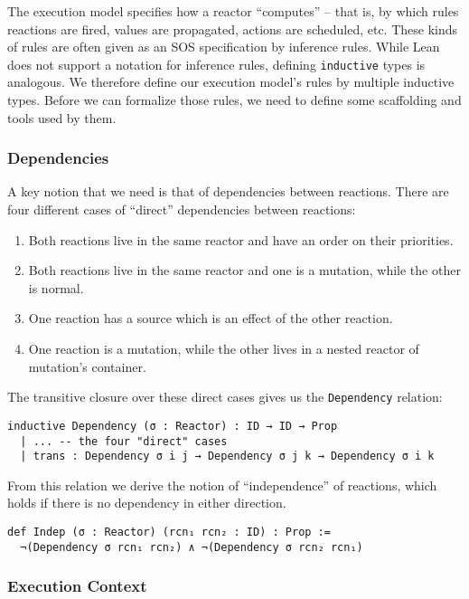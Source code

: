 The execution model specifies how a reactor ``computes'' -- that is, by which rules reactions are fired, values are propagated, actions are scheduled, etc. 
These kinds of rules are often given as an SOS specification by inference rules.
While Lean does not support a notation for inference rules, defining \lstinline{inductive} types is analogous.
We therefore define our execution model's rules by multiple inductive types.
Before we can formalize those rules, we need to define some scaffolding and tools used by them.

\subsubsection{Dependencies}

A key notion that we need is that of dependencies between reactions. 
There are four different cases of ``direct'' dependencies between reactions:

\begin{enumerate}
  \item Both reactions live in the same reactor and have an order on their priorities.
  \item Both reactions live in the same reactor and one is a mutation, while the other is normal.
  \item One reaction has a source which is an effect of the other reaction.
  \item One reaction is a mutation, while the other lives in a nested reactor of mutation's container.
\end{enumerate}

The transitive closure over these direct cases gives us the \lstinline{Dependency} relation:

\begin{lstlisting}
inductive Dependency (σ : Reactor) : ID → ID → Prop
  | ... -- the four "direct" cases
  | trans : Dependency σ i j → Dependency σ j k → Dependency σ i k
\end{lstlisting}

From this relation we derive the notion of ``independence'' of reactions, which holds if there is no dependency in either direction.

\begin{lstlisting}
def Indep (σ : Reactor) (rcn₁ rcn₂ : ID) : Prop :=
  ¬(Dependency σ rcn₁ rcn₂) ∧ ¬(Dependency σ rcn₂ rcn₁)
\end{lstlisting}

\subsubsection{Execution Context}

